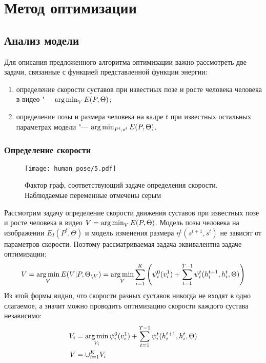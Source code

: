 \section{Метод оптимизации}

\subsection{Анализ модели}

\label{subsec::model_analysis}

Для описания предложенного алгоритма оптимизации важно рассмотреть две задачи, связанные с функцией представленной функции энергии:
\begin{enumerate}
	\item определение скорости суставов при известных позе и росте человека человека в видео "--- $\operatorname*{arg\,min}_{V} E(P, \Theta)$;
	\item определение позы и размера человека на кадре $t$ при известных остальных параметрах модели "--- $\operatorname*{arg\,min}_{P^t, s^t} E(P, \Theta)$.
\end{enumerate}

\subsubsection{Определение скорости}

\begin{figure*}[!t] 
	\begin{center}
		\texttt{[image: human\_pose/5.pdf]}
	\end{center}
	\caption{Фактор граф, соответствующий задаче определения скорости. Наблюдаемые переменные отмечены серым} \label{gm:velocity}
\end{figure*}

Рассмотрим задачу определение скорости движения суставов при известных позе и росте человека в видео $V = \operatorname*{arg\,min}_{V} E(P, \Theta)$. Модель позы человека на изображении $E_I(P^t, \Theta)$ и модель изменения размера $\eta^t(s^{t+1}, s^t)$ не зависят от параметров скорости. Поэтому рассматриваемая задача эквивалентна задаче оптимизации:
\begin{equation}
	V = \operatorname*{arg\,min}_V E(V|P, \Theta_{\backslash V}) = \operatorname*{arg\,min}_V {\sum_{i=1}^K\left(\psi^0_i(v^1_i) + \sum_{t=1}^{T-1}\psi_i^t(h_i^{t+1}, h_i^{t}, \Theta) \right)}
\end{equation}
Из этой формы видно, что скорости разных суставов никогда не входят в одно слагаемое, а значит можно проводить оптимизацию скорости каждого сустава независимо:
\begin{equation}
	\begin{aligned}
		V_i &= \operatorname*{arg\,min}_{V_i} \psi^0_i(v^1_i) + \sum_{t=1}^{T-1}\psi_i^t(h_i^{t+1}, h_i^{t}, \Theta) \\
		V &= \cup_{i=1}^K V_i
	\end{aligned}
\end{equation}

